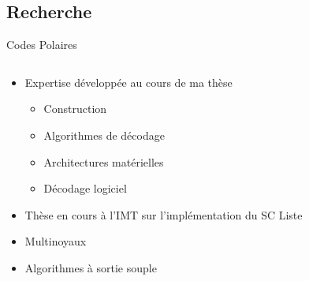 \documentclass[t,compress,mathserif,12pt,xcolor=dvipsnames]{beamer}
\begin{document}
\subsection{Recherche}
\begin{frame}[t]{Codes Polaires}
  \begin{minipage}[t][5.0cm][t]{\textwidth}
    \begin{columns}[T]
      \begin{column}{0.63\textwidth}
        \vspace{-0.5cm}
        \begin{itemize}
          \item<+-> Expertise développée au cours de ma thèse
            \begin{itemize}
              \item<+-> Construction
              \item<2-> Algorithmes de décodage
              \item<2-> Architectures matérielles
              \item<2-> Décodage logiciel
            \end{itemize}
          \item<+-> Thèse en cours à l'IMT sur l'implémentation du SC Liste
          \item<+-> Multinoyaux
          \item<+-> Algorithmes à sortie souple
        \end{itemize} 
      \end{column}
      \begin{column}{0.04\textwidth}


\end{column}
\end{columns}
\end{minipage}
\end{frame}
\end{document}
